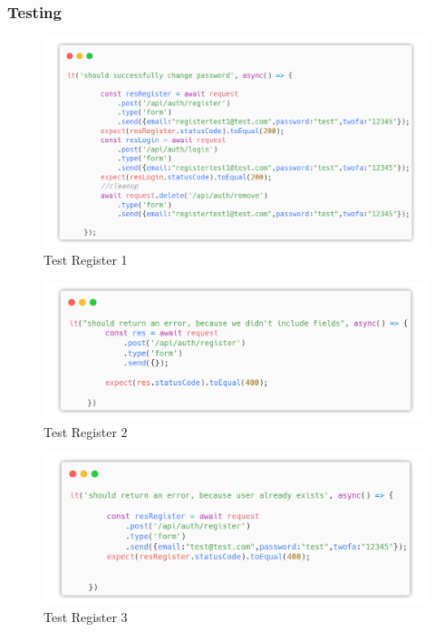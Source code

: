 \documentclass{report}
\begin{document}
\subsubsection*{Testing}
\begin{figure}[H]
	\centering\includegraphics[width=1\textwidth]{images/microservizio-autenticazione/tests/register_test_1.png}
	\caption{Test Register 1}
\end{figure}
\begin{figure}[H]
	\centering\includegraphics[width=1\textwidth]{images/microservizio-autenticazione/tests/register_test_2.png}
	\caption{Test Register 2}
\end{figure}
\begin{figure}[H]
	\centering\includegraphics[width=1\textwidth]{images/microservizio-autenticazione/tests/register_test_3.png}
	\caption{Test Register 3}
\end{figure}
\end{document}
